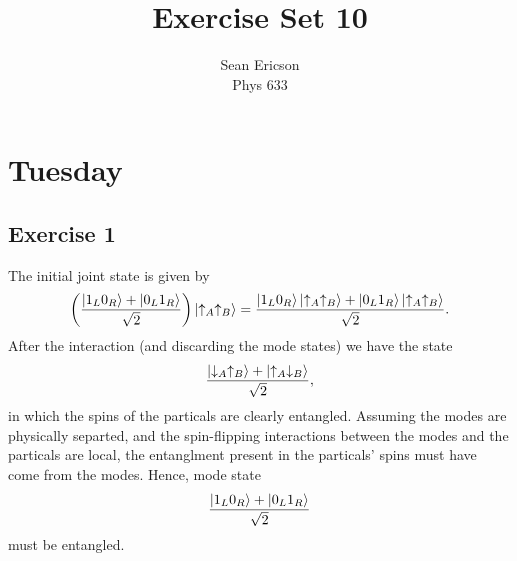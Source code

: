 \documentclass[12pt]{article}
\begin{document}
	
\title{Exercise Set 10}
\author{Sean Ericson \\ Phys 633}
\maketitle

\section*{Tuesday}

\subsection*{Exercise 1}
The initial joint state is given by
\[ \left(\frac{\ket{1_L0_R} + \ket{0_L1_R}}{\sqrt{2}}\right)\ket{\uparrow_A\uparrow_B} = \frac{\ket{1_L0_R}\ket{\uparrow_A\uparrow_B} + \ket{0_L1_R}\ket{\uparrow_A\uparrow_B}}{\sqrt{2}}. \]
After the interaction (and discarding the mode states) we have the state
\[ \frac{\ket{\downarrow_A\uparrow_B} + \ket{\uparrow_A\downarrow_B}}{\sqrt{2}}, \]
in which the spins of the particals are clearly entangled. Assuming the modes are physically separted, and the spin-flipping interactions between the modes and the particals are local, the entanglment present in the particals' spins must have come from the modes. Hence, mode state
\[ \frac{\ket{1_L0_R} + \ket{0_L1_R}}{\sqrt{2}} \]
must be entangled.
\end{document}
